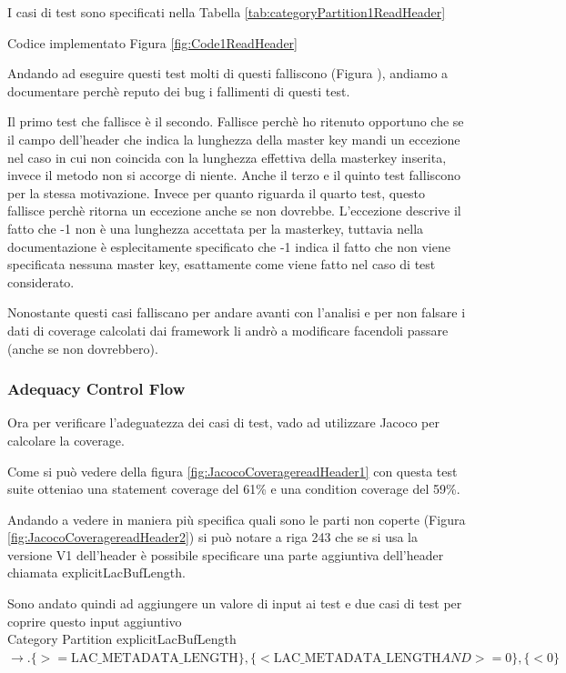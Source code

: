 \documentclass[12pt, a4paper]{article}
\begin{document}
I casi di test sono specificati nella Tabella \ref{tab:categoryPartition1ReadHeader}

Codice implementato Figura \ref{fig:Code1ReadHeader}


Andando ad eseguire questi test molti di questi falliscono (Figura ), andiamo a documentare perchè reputo 
dei bug i fallimenti di questi test.

Il primo test che fallisce è il secondo. Fallisce perchè ho ritenuto opportuno che se il campo dell'header 
che indica la lunghezza della master key mandi un eccezione nel caso in cui non coincida con la lunghezza effettiva 
della masterkey inserita, invece il metodo non si accorge di niente.
Anche il terzo e il quinto test falliscono per la stessa motivazione. 
Invece per quanto riguarda il quarto test, questo fallisce perchè ritorna un eccezione anche se non dovrebbe. 
L'eccezione descrive il fatto che -1 non è una lunghezza accettata per la masterkey, tuttavia nella documentazione è
esplecitamente specificato che -1 indica il fatto che non viene specificata nessuna master key, esattamente come viene 
fatto nel caso di test considerato.

Nonostante questi casi falliscano per andare avanti con l'analisi e per non falsare i dati di coverage calcolati
dai framework li andrò a modificare facendoli passare (anche se non dovrebbero).


\subsubsection{Adequacy Control Flow}
Ora per verificare l'adeguatezza dei casi di test, vado ad utilizzare
Jacoco per calcolare la coverage.

Come si può vedere della figura \ref{fig:JacocoCoveragereadHeader1} con questa test suite otteniao
una statement coverage del 61\% e una condition coverage del 59\%.

Andando a vedere in maniera più specifica quali sono le parti non coperte (Figura \ref{fig:JacocoCoveragereadHeader2})
si può notare a riga 243 che se si usa la versione V1 dell'header è possibile specificare una parte aggiuntiva dell'header
chiamata explicitLacBufLength.

Sono andato quindi ad aggiungere un valore di input ai test e due casi di test per coprire questo input aggiuntivo \\
Category Partition explicitLacBufLength $\rightarrow.
\{ >= \text{LAC\_METADATA\_LENGTH} \},
\{ <  \text{LAC\_METADATA\_LENGTH} AND >= 0\}, 
\{ < 0 \}$ 
\end{document}
